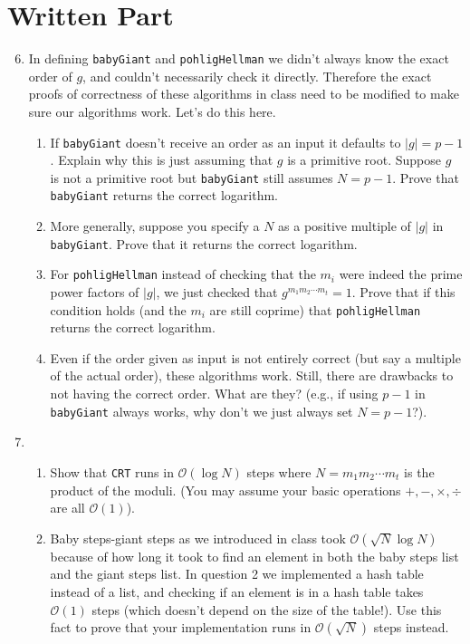 \documentclass[11pt]{article}
\newcommand{\cO}{\mathcal{O}}
\begin{document}
\section*{Written Part}
\begin{enumerate}
  \setcounter{enumi}{5}
  \item{
  In defining \verb|babyGiant| and \verb|pohligHellman| we didn't always know the exact order of $g$, and couldn't necessarily check it directly.  Therefore the exact proofs of correctness of these algorithms in class need to be modified to make sure our algorithms work.  Let's do this here.
  \begin{enumerate}
    \item{
    If \verb|babyGiant| doesn't receive an order as an input it defaults to $|g| = p-1$.  Explain why this is just assuming that $g$ is a primitive root.  Suppose $g$ is not a primitive root but \verb|babyGiant| still assumes $N=p-1$.  Prove that \verb|babyGiant| returns the correct logarithm.
    }
    \item{
    More generally, suppose you specify a $N$ as a positive multiple of $|g|$ in \verb|babyGiant|.  Prove that it returns the correct logarithm.
    }
    \item{
    For \verb|pohligHellman| instead of checking that the $m_i$ were indeed the prime power factors of $|g|$, we just checked that $g^{m_1m_2\cdots m_t} = 1$.  Prove that if this condition holds (and the $m_i$ are still coprime) that \verb|pohligHellman| returns the correct logarithm.
    }
    \item{
    Even if the order given as input is not entirely correct (but say a multiple of the actual order), these algorithms work.  Still, there are drawbacks to not having the correct order.  What are they?  (e.g., if using $p-1$ in \verb|babyGiant| always works, why don't we just always set $N=p-1$?).
    }
  \end{enumerate}
  }
  \item{
  \begin{enumerate}
    \item{
    Show that \verb|CRT| runs in $\cO(\log N)$ steps where $N = m_1m_2\cdots m_t$ is the product of the moduli.  (You may assume your basic operations $+,-,\times,\div$ are all $\cO(1)$).
    }
    \item{
    Baby steps-giant steps as we introduced in class took $\cO(\sqrt N\log N)$ because of how long it took to find an element in both the baby steps list and the giant steps list.  In question 2 we implemented a hash table instead of a list, and checking if an element is in a hash table takes $\cO(1)$ steps (which doesn't depend on the size of the table!).  Use this fact to prove that your implementation runs in $\cO(\sqrt N)$ steps instead.
}
\end{enumerate}}
\end{enumerate}
\end{document}
